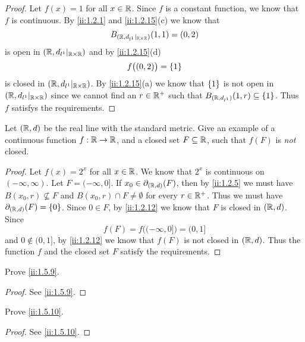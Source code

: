 \begin{proof}
  Let \(f(x) = 1\) for all \(x \in \mathbb{R}\).
  Since \(f\) is a constant function, we know that \(f\) is continuous.
  By \cref{ii:1.2.1} and \cref{ii:1.2.15}(c) we know that
  \[
    B_{(\mathbb{R}, d_{l^1}|_{\mathbb{R} \times \mathbb{R}})}(1, 1) = (0, 2)
  \]
  is open in \((\mathbb{R}, d_{l^1}|_{\mathbb{R} \times \mathbb{R}})\) and by \cref{ii:1.2.15}(d)
  \[
    f\big((0, 2)\big) = \left\lbrace1\right\rbrace
  \]
  is closed in \((\mathbb{R}, d_{l^1}|_{\mathbb{R} \times \mathbb{R}})\).
  By \cref{ii:1.2.15}(a) we know that \(\left\lbrace1\right\rbrace\) is not open in \((\mathbb{R}, d_{l^1}|_{\mathbb{R} \times \mathbb{R}})\) since we cannot find an \(r \in \mathbb{R}^+\) such that \(B_{(\mathbb{R}, d_{l^1})}(1, r) \subseteq \left\lbrace1\right\rbrace\).
  Thus \(f\) satisfys the requirements.
\end{proof}

\begin{ex}\label{ii:ex:1.5.5}
  Let \((\mathbb{R}, d)\) be the real line with the standard metric.
  Give an example of a continuous function \(f : \mathbb{R} \to \mathbb{R}\), and a closed set \(F \subseteq \mathbb{R}\), such that \(f(F)\) is \emph{not} closed.
\end{ex}

\begin{proof}
  Let \(f(x) = 2^x\) for all \(x \in \mathbb{R}\).
  We know that \(2^x\) is continuous on \((-\infty, \infty)\).
  Let \(F = (-\infty, 0]\).
  If \(x_0 \in \partial_{(\mathbb{R}, d)}(F)\), then by \cref{ii:1.2.5} we must have \(B(x_0, r) \not\subseteq F\) and \(B(x_0, r) \cap F \neq \emptyset\) for every \(r \in \mathbb{R}^+\).
  Thus we must have \(\partial_{(\mathbb{R}, d)}(F) = \left\lbrace0\right\rbrace\).
  Since \(0 \in F\), by \cref{ii:1.2.12} we know that \(F\) is closed in \((\mathbb{R}, d)\).
  Since
  \[
    f(F) = f\big((-\infty, 0]\big) = (0, 1]
  \]
  and \(0 \notin (0, 1]\), by \cref{ii:1.2.12} we know that \(f(F)\) is not closed in \((\mathbb{R}, d)\).
  Thus the function \(f\) and the closed set \(F\) satisfy the requirements.
\end{proof}

\begin{ex}\label{ii:ex:1.5.6}
  Prove \cref{ii:1.5.9}.
\end{ex}

\begin{proof}
  See \cref{ii:1.5.9}.
\end{proof}

\begin{ex}\label{ii:ex:1.5.7}
  Prove \cref{ii:1.5.10}.
\end{ex}

\begin{proof}
  See \cref{ii:1.5.10}.
\end{proof}

